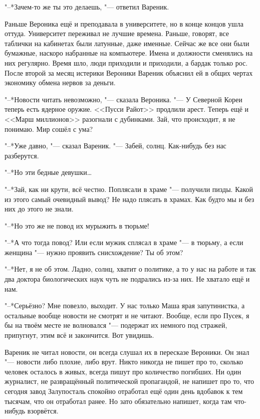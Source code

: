 "--*Зачем-то же ты это делаешь, "--- ответил Вареник.

Раньше Вероника ещё и преподавала в университете, но в конце концов ушла оттуда.
Университет переживал не лучшие времена.
Раньше, говорят, все таблички на кабинетах были латунные, даже именные.
Сейчас же все они были бумажные, наскоро набранные на компьютере.
Имена и должности сменялись на них регулярно.
Время шло, люди приходили и приходили, а бардак только рос.
После второй за месяц истерики Вероники Вареник объяснил ей в общих чертах экономику обмена нервов за деньги.

\asterism

\textspace

\label{Thu_2012_05_10}

"--*Новости читать невозможно, "--- сказала Вероника.
"--- У Северной Кореи теперь есть ядерное оружие.
<<Пусси Райот>> продлили арест.
Теперь ещё и <<Марш миллионов>> разогнали с дубинками.
Зай, что происходит, я не понимаю.
Мир сошёл с ума?

"--*Уже давно, "--- сказал Вареник.
"--- Забей, солнц.
Как-нибудь без нас разберутся.

"--*Но эти бедные девушки\ldots{}

"--*Зай, как ни крути, всё честно.
Поплясали в храме "--- получили пизды.
Какой из этого самый очевидный вывод?
Не надо плясать в храмах.
Как будто мы и без них до этого не знали.

"--*Но это же не повод их мурыжить в тюрьме!

"--*А что тогда повод?
Или если мужик сплясал в храме "--- в тюрьму, а если женщина "--- нужно проявить снисхождение?
Ты об этом?

"--*Нет, я не об этом.
Ладно, солнц, хватит о политике, а то у нас на работе и так два доктора биологических наук чуть не подрались из-за них.
Не хватало ещё и нам.

"--*Серьёзно?
Мне повезло, выходит.
У нас только Маша ярая запутинистка, а остальные вообще новости не смотрят и не читают.
Вообще, если про Пусек, я бы на твоём месте не волновался "--- подержат их немного под стражей, припугнут, этим всё и закончится.
Вот увидишь.

\asterism

Вареник не читал новости, он всегда слушал их в пересказе Вероники.
Он знал "--- новости либо плохие, либо врут.
Никто никогда не пишет про то, сколько человек осталось в живых, всегда пишут про количество погибших.
Ни один журналист, не развращённый политической пропагандой, не напишет про то, что сегодня завод Залупосталь спокойно отработал ещё один день вдобавок к тем тысячам, что он отработал ранее.
Но зато обязательно напишет, когда там что-нибудь взорвётся.

